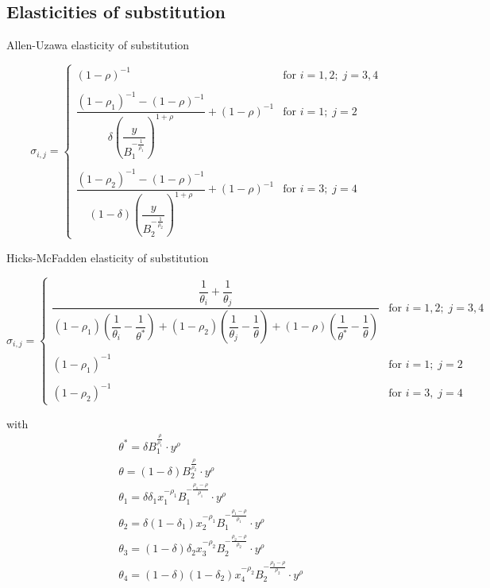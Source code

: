 \subsection{Elasticities of substitution}
\label{sec:elaSub4}

Allen-Uzawa elasticity of substitution
\citep[see][]{sato67} 

\begin{equation}
\sigma_{i,j} = \begin{cases} 
        (1 - \rho )^{-1}
        & \text{for } i=1,2; \; j=3,4 \\ 
        & \\
        \dfrac{ (1-\rho_1)^{-1} - (1-\rho)^{-1}}
        {\delta \left( \dfrac{y}{
        B_1^{-\frac{1}{\rho_1}}}\right)^{1+\rho}}+(1-\rho)^{-1}  
        & \text{for } i=1; \; j=2\\
        & \\
        \dfrac{ (1-\rho_2)^{-1} - (1-\rho)^{-1}}
        {(1-\delta) \left( \dfrac{y}{ 
        B_2^{-\frac{1}{\rho_2}}}\right)^{1+\rho}}+(1-\rho)^{-1}  
        & \text{for } i=3; \; j=4 
   \end{cases}
\end{equation}  


Hicks-McFadden elasticity of substitution
\citep[see][]{sato67} 

\begin{equation}
\sigma_{i,j} = \begin{cases} 
        \dfrac{\dfrac{1}{\theta_i} + \dfrac{1}{\theta_j}}
        {(1-\rho_1) \left( \dfrac{1}{\theta_i} - \dfrac{1}{\theta^*} \right)
        + (1-\rho_2) \left( \dfrac{1}{\theta_j} - \dfrac{1}{\theta} \right)
        + (1-\rho) \left( \dfrac{1}{\theta^*} - \dfrac{1}{\theta} \right) }
        & \text{for } i=1,2; \; j=3,4 \\ 
        & \\
        (1-\rho_1)^{-1}
        & \text{for } i=1; \; j=2 \\
        & \\
        (1-\rho_2)^{-1}
        & \text{for } i=3, \; j=4 
   \end{cases}
\end{equation} 

with 
\begin{align}
& \theta^* = \delta
            B_1^{\frac{\rho}{\rho_1}} \cdot y^\rho \\
& \theta = (1-\delta)
            B_2^{\frac{\rho}{\rho_2}} \cdot y^{\rho} \\
& \theta_1 = \delta \delta_1 x_1^{-\rho_1} 
            B_1^{-\frac{\rho_1 - \rho}{\rho_1}}
            \cdot y^{\rho} \\
& \theta_2 = \delta (1 - \delta_1) x_2^{-\rho_1} 
            B_1^{-\frac{\rho_1 - \rho}{\rho_1}}
            \cdot y^{\rho} \\
& \theta_3 = ( 1 - \delta ) \delta_2 x_3^{-\rho_2} 
            B_2^{-\frac{\rho_2 - \rho}{\rho_2}}
            \cdot y^{\rho} \\
& \theta_4 = ( 1 - \delta ) (1 - \delta_2) x_4^{-\rho_2} 
            B_2^{-\frac{\rho_2 - \rho}{\rho_2}}
            \cdot y^{\rho} 
\end{align}
